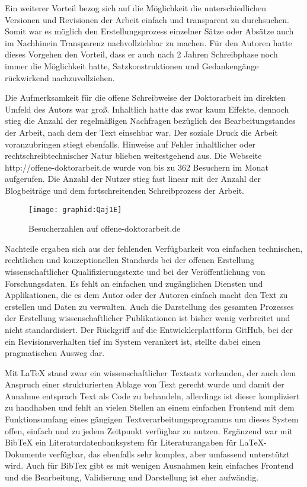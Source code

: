 Ein weiterer Vorteil bezog sich auf die Möglichkeit die unterschiedlichen Versionen und Revisionen der Arbeit einfach und transparent zu durchsuchen. Somit war es möglich den Erstellungsprozess einzelner Sätze oder Absätze auch im Nachhinein Transparenz nachvollziehbar zu machen. Für den Autoren hatte dieses Vorgehen den Vorteil, dass er auch nach 2 Jahren Schreibphase noch immer die Möglichkeit hatte, Satzkonstruktionen und Gedankengänge rückwirkend nachzuvollziehen.

Die Aufmerksamkeit für die offene Schreibweise der Doktorarbeit im direkten Umfeld des Autors war groß. Inhaltlich hatte das zwar kaum Effekte, dennoch stieg die Anzahl der regelmäßigen Nachfragen bezüglich des Bearbeitungstandes der Arbeit, nach dem der Text einsehbar war. Der soziale Druck die Arbeit voranzubringen stiegt ebenfalls. Hinweise auf Fehler inhaltlicher oder rechtschreibtechnischer Natur blieben weitestgehend aus. Die Webseite http://offene-doktorarbeit.de wurde von bis zu 362 Besuchern im Monat aufgerufen. Die Anzahl der Nutzer stieg fast linear mit der Anzahl der Blogbeiträge und dem fortschreitenden Schreibprozess der Arbeit.

\begin{figure}[h!]
\texttt{[image: graphid:Qaj1E]}
\caption{Besucherzahlen auf offene-doktorarbeit.de}
\end{figure}

Nachteile ergaben sich aus der fehlenden Verfügbarkeit von einfachen technischen, rechtlichen und konzeptionellen Standards bei der offenen Erstellung wissenschaftlicher Qualifizierungstexte und bei der Veröffentlichung von Forschungsdaten. Es fehlt an einfachen und zugänglichen Diensten und Applikationen, die es dem Autor oder der Autoren einfach macht den Text zu erstellen und Daten zu verwalten. Auch die Darstellung des gesamten Prozesses der Erstellung wissenschaftlicher Publikationen ist bisher wenig verbreitet und nicht standardisiert. Der Rückgriff auf die Entwicklerplattform GitHub, bei der ein Revisionsverhalten tief im System verankert ist, stellte dabei einen pragmatischen Ausweg dar.

Mit LaTeX stand zwar ein wissenschaftlicher Textsatz vorhanden, der auch dem Anspruch einer strukturierten Ablage von Text gerecht wurde und damit der Annahme entsprach Text als Code zu behandeln, allerdings ist dieser kompliziert zu handhaben und fehlt an vielen Stellen an einem einfachen Frontend mit dem Funktionsumfang eines gängigen Textverarbeitungsprogramms um dieses System offen, einfach und zu jedem Zeitpunkt verfügbar zu nutzen. Ergänzend war mit BibTeX ein Literaturdatenbanksystem für Literaturangaben für LaTeX-Dokumente verfügbar, das ebenfalls sehr komplex, aber umfassend unterstützt wird. Auch für BibTex gibt es mit wenigen Ausnahmen kein einfaches Frontend und die Bearbeitung, Validierung und Darstellung ist eher aufwändig.

